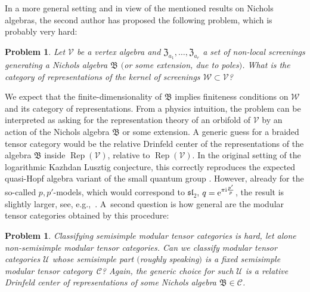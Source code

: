 \documentclass[pdftex]{sigma}%
\numberwithin{equation}{section}
\newtheorem{prob}[teo]{Problem}
\newcommand{\zem}{\mathfrak{Z}}
\begin{document}
In a more general setting and in view of the mentioned results on Nichols algebras, the second author has proposed the following problem, which is probably very hard:
\begin{prob} Let $\mathcal{V}$ be a vertex algebra and $\zem_{a_1},\dots,\zem_{a_r}$ a set of non-local screenings generating a Nichols algebra $\mathfrak{B}$ $($or some extension, due to poles$)$. What is the category of representations of the kernel of screenings $\mathcal{W}\subset\mathcal{V}$?
\end{prob}

We expect that the finite-dimensionality of $\mathfrak{B}$ implies finiteness conditions on $\mathcal{W}$ and its category of representations. From a physics intuition, the problem can be interpreted as asking for the representation theory of an orbifold of $\mathcal{V}$ by an action of the Nichols algebra $\mathfrak{B}$ or some extension. A generic guess for a braided tensor category would be the relative Drinfeld center of the representations of the algebra $\mathfrak{B}$ inside $\operatorname{Rep}(\mathcal{V})$, relative to $\operatorname{Rep}(\mathcal{V})$. In the original setting of the logarithmic Kazhdan Lusztig conjecture, this correctly reproduces the expected quasi-Hopf algebra variant of the small quantum group \cite{CGR20,GLO18, Ne21}. However, already for the so-called $p,p'$-models, which would correspond to $\mathfrak{sl}_2$, $q={\rm e}^{\pi {\rm i}\frac{p'}{p}}$, the result is slightly larger, see, e.g.,~\cite{GRW09}. A~second question is how general are the modular tensor categories obtained by this procedure:

\begin{prob}
Classifying semisimple modular tensor categories is hard, let alone non-semi\-simple modular tensor categories. Can we classify modular tensor categories $\mathcal{U}$ whose semisimple part $($roughly speaking$)$ is a fixed semisimple modular tensor category~$\mathcal{C}$? Again, the generic choice for such $\mathcal{U}$ is a relative Drinfeld center of representations of some Nichols algebra $\mathfrak{B}\in\mathcal{C}$.
\end{prob}
\end{document}

